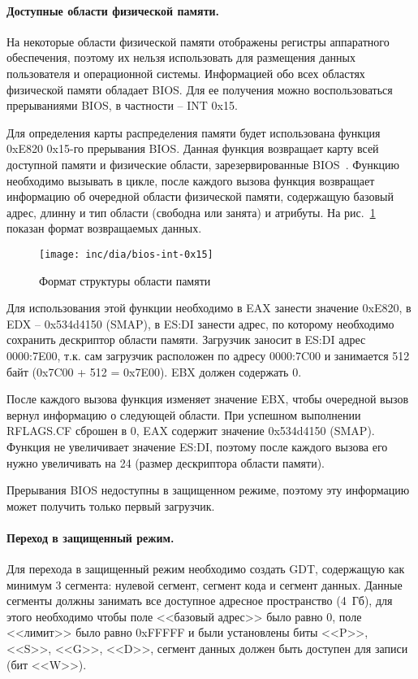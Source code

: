 \paragraph{Доступные области физической памяти.} На некоторые области физической памяти
отображены регистры аппаратного обеспечения, поэтому их нельзя использовать для размещения
данных пользователя и операционной системы. Информацией обо всех областях физической памяти
обладает BIOS. Для ее получения можно воспользоваться прерываниями BIOS, в частности -- INT 0x15.

Для определения карты распределения памяти будет использована функция 0xE820 0x15-го прерывания
BIOS. Данная функция возвращает карту всей доступной памяти и физические области, зарезервированные
BIOS~\cite{bios_int15h}. Функцию необходимо вызывать в цикле, после каждого вызова функция возвращает
информацию об очередной области физической памяти, содержащую базовый адрес, длинну и тип области
(свободна или занята) и атрибуты. На рис.~\ref{fig:bios-int-0x15} показан формат возвращаемых данных.

\begin{figure}[ht!]
  \centering
  \texttt{[image: inc/dia/bios-int-0x15]}
  \caption{Формат структуры области памяти}
  \label{fig:bios-int-0x15}
\end{figure}

Для использования этой функции необходимо в EAX занести значение 0xE820, в EDX -- 0x534d4150 (SMAP),
в ES:DI занести адрес, по которому необходимо сохранить дескриптор области памяти. Загрузчик
заносит в ES:DI адрес 0000:7E00, т.к. сам загрузчик расположен по адресу 0000:7C00 и
занимается 512 байт (0x7C00 + 512 = 0x7E00). EBX должен содержать 0.

После каждого вызова функция изменяет значение EBX, чтобы очередной вызов вернул информацию о следующей
области. При успешном выполнении RFLAGS.CF сброшен в 0, EAX содержит значение 0x534d4150 (SMAP).
Функция не увеличивает значение ES:DI, поэтому после каждого вызова его нужно увеличивать на 24 (размер
дескриптора области памяти).

Прерывания BIOS недоступны в защищенном режиме, поэтому эту информацию может получить только первый загрузчик.

\paragraph{Переход в защищенный режим.} Для перехода в защищенный режим необходимо создать GDT,
содержащую как минимум 3 сегмента: нулевой сегмент, сегмент кода и сегмент данных. Данные сегменты
должны занимать все доступное адресное пространство (4~Гб), для этого необходимо чтобы поле
<<базовый адрес>> было равно 0, поле <<лимит>> было равно 0xFFFFF и были установлены биты
<<P>>, <<S>>, <<G>>, <<D>>, сегмент данных должен быть доступен для записи (бит <<W>>).

